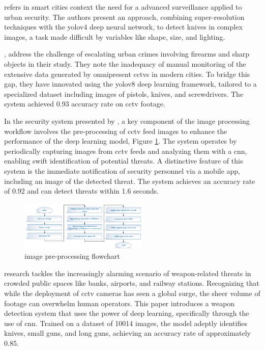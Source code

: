 \citet{rfc18} refers in smart cities context the need for a advanced surveillance applied to urban security. The authors present an approach, combining super-resolution techniques with the \ac{yolo}v4 deep neural network, to detect knives in complex images, a task made difficult by variables like shape, size, and lighting.

\citet{rfc17}, address the challenge of escalating urban crimes involving firearms and sharp objects in their study. They note the inadequacy of manual monitoring of the extensive data generated by omnipresent \ac{cctv}s in modern cities. To bridge this gap, they have innovated using the \ac{yolo}v8 deep learning framework, tailored to a specialized dataset including images of pistols, knives, and screwdrivers. The system achieved 0.93 accuracy rate on \ac{cctv} footage.

In the security system presented by \citet{rfc19}, a key component of the image processing workflow involves the pre-processing of \ac{cctv} feed images to enhance the performance of the deep learning model, Figure \ref{fig:al-mousa-flow}. The system operates by periodically capturing images from \ac{cctv} feeds and analyzing them with a \ac{cnn}, enabling swift identification of potential threats. A distinctive feature of this system is the immediate notification of security personnel via a mobile app, including an image of the detected threat. The system achieves an accuracy rate of 0.92 and can detect threats within 1.6 seconds.

\begin{figure}[h]
    \centering 
    \includegraphics[width=0.55\textwidth]{figs/al-mousa-flowchart.png} 
    \caption{\citet{rfc19} image pre-processing flowchart}
    \label{fig:al-mousa-flow}
\end{figure}

\citet{rfc6} research tackles the increasingly alarming scenario of weapon-related threats in crowded public spaces like banks, airports, and railway stations. Recognizing that while the deployment of \ac{cctv} cameras has seen a global surge, the sheer volume of footage can overwhelm human operators. This paper introduces a weapon detection system that uses the power of deep learning, specifically through the use of \ac{cnn}. Trained on a dataset of 10014 images, the model adeptly identifies knives, small guns, and long guns, achieving an accuracy rate of approximately 0.85.

